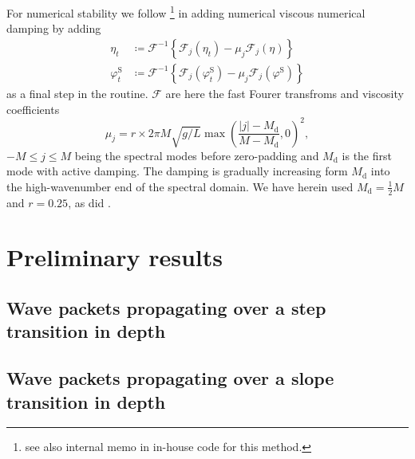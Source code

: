 \documentclass[internal]{sintefmemo}
\newcommand{\mr}{\mathrm}
\renewcommand{\S}{^\mr{S}}
\renewcommand{\_}[1]{_\mr{#1}}
\newcommand{\rbr}[1]{\left(#1\right)}
\newcommand{\cbr}[1]{\left\{#1\right\}}
\begin{document}
For numerical stability we follow \citet{chalikov2005modeling}\footnote{see also internal memo in in-house code for this method.}
in adding numerical viscous numerical damping by adding
\newcommand{\FF}{\mathcal F}
\begin{subequations}
\begin{align}
\eta_t &\coloneqq \FF^{-1}\cbr{\FF_j(\eta_t) - \mu_j \FF_j(\eta) }\\
\varphi\S_t &\coloneqq  \FF^{-1}\cbr{\FF_j(\varphi\S_t) - \mu_j \FF_j(\varphi\S) }
\end{align}%
\label{eq:damping}%
\end{subequations}
as a final step in the routine.
$\FF$ are here the fast Fourer transfroms and viscosity coefficients
\begin{equation}
\mu_j =r\times 2\pi M \sqrt{g/L}\max\rbr{\frac{|j|-M\_d}{M-M\_d},0 	}^2,
\label{eq:damping_nu}
\end{equation}
$-M\leq j \leq M$ being the spectral modes before zero-padding and $M\_d$ is the first mode with active damping.
The damping is gradually increasing form $M\_d$ into the high-wavenumber end of the spectral domain.
We have herein used $M\_d = \frac12 M$ and $r=0.25$, as did \citet{chalikov2005modeling}.

\section{Preliminary results}
\label{sec:results}



\subsection{Wave packets propagating over a step transition in depth}
\label{sec:results:step}


\subsection{Wave packets propagating over a slope transition in depth}
\label{sec:results:slope}

\end{document}
